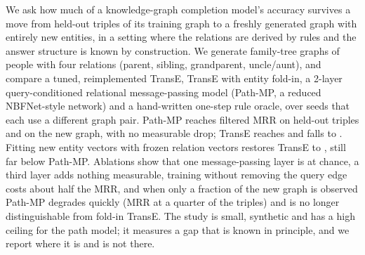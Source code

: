 We ask how much of a knowledge-graph completion model's accuracy survives a move from held-out triples of its training graph to a freshly generated graph with entirely new entities, in a setting where the relations are derived by rules and the answer structure is known by construction. We generate family-tree graphs of  people with four relations (parent, sibling, grandparent, uncle/aunt), and compare a tuned, reimplemented TransE, TransE with entity fold-in, a 2-layer query-conditioned relational message-passing model (Path-MP, a reduced NBFNet-style network) and a hand-written one-step rule oracle, over  seeds that each use a different graph pair. Path-MP reaches filtered MRR  on held-out triples and  on the new graph, with no measurable drop; TransE reaches  and falls to . Fitting new entity vectors with frozen relation vectors restores TransE to , still far below Path-MP. Ablations show that one message-passing layer is at chance, a third layer adds nothing measurable, training without removing the query edge costs about half the MRR, and when only a fraction of the new graph is observed Path-MP degrades quickly (MRR  at a quarter of the triples) and is no longer distinguishable from fold-in TransE. The study is small, synthetic and has a high ceiling for the path model; it measures a gap that is known in principle, and we report where it is and is not there.
